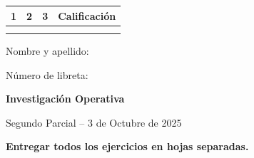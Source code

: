 \documentclass[a4paper,oneside,12pt]{amsart}
\newcommand{\nombremateria}
{Investigaci\'on Operativa}
\newcommand{\numeroparcial}
    { Segundo Parcial }
\newcommand{\fecha}
    {3 de Octubre de 2025}
\theoremstyle{definition}
\begin{document}
\hfill \hfill
\begin{tabular}[c]{|c|c|c|c|}
\hline 
1 & 2 & 3 & Calificaci\'on \\ \hline \hline
\hspace{1.2 cm} & \hspace{1.2 cm} & \hspace{1.2 cm} &\hspace{1.5 cm} \\
\hspace{1.2 cm} & \hspace{1.2 cm} & \hspace{1.2 cm} &\hspace{1.5 cm} \\ \hline

\end{tabular}

\vspace{-1cm}

\noindent Nombre y apellido:


\noindent Número de libreta:

\noindent \hrulefill 

\renewcommand{\baselinestretch}{1.1}

\begin{center}
	\large \textbf{\nombremateria} 
	
	\numeroparcial -- \fecha
\end{center}

\renewcommand{\theenumi}{\textbf{\arabic{enumi}}}

\begin{center}
    \textbf{Entregar todos los ejercicios en hojas separadas.}
\end{center}
\end{document}
